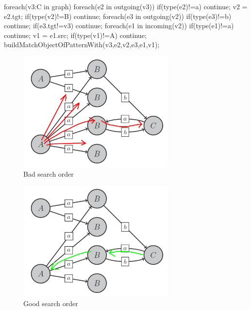\begin{csharp}
foreach(v3:C in graph) {
	foreach(e2 in outgoing(v3)) {
		if(type(e2)!=a) continue;
		v2 = e2.tgt;
		if(type(v2)!=B) continue;
		foreach(e3 in outgoing(v2)) {
			if(type(e3)!=b) continue;
			if(e3.tgt!=v3) continue;
				foreach(e1 in incoming(v2)) {
				if(type(e1)!=a) continue;
				v1 = e1.src;
				if(type(v1)!=A) continue;
				buildMatchObjectOfPatternWith(v3,e2,v2,e3,e1,v1);
			} 
		}
	}
}
\end{csharp}

\vspace{15cm}

\begin{figure}[hptb]
  \centering
  \includegraphics[width=0.7\textwidth]{fig/GraphBad}
  \caption{Bad search order}
  \label{figbadsearch}
\end{figure}

\begin{figure}[hpbt]
  \centering
  \includegraphics[width=0.7\textwidth]{fig/GraphGood}
  \caption{Good search order}
  \label{figgoodsearch}
\end{figure}

